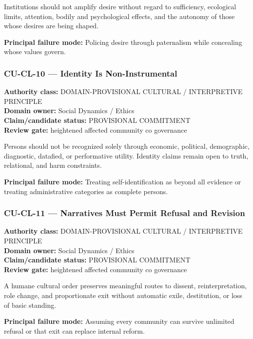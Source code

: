 \documentclass[
  11pt,
]{article}
\begin{document}
Institutions should not amplify desire without regard to sufficiency,
ecological limits, attention, bodily and psychological effects, and the
autonomy of those whose desires are being shaped.

\textbf{Principal failure mode:} Policing desire through paternalism
while concealing whose values govern.

\subsubsection{CU-CL-10 --- Identity Is
Non-Instrumental}\label{cu-cl-10-identity-is-non-instrumental}

\textbf{Authority class:} DOMAIN-PROVISIONAL CULTURAL / INTERPRETIVE
PRINCIPLE\\
\textbf{Domain owner:} Social Dynamics / Ethics\\
\textbf{Claim/candidate status:} PROVISIONAL COMMITMENT\\
\textbf{Review gate:} heightened affected community co governance

Persons should not be recognized solely through economic, political,
demographic, diagnostic, datafied, or performative utility. Identity
claims remain open to truth, relational, and harm constraints.

\textbf{Principal failure mode:} Treating self-identification as beyond
all evidence or treating administrative categories as complete persons.

\subsubsection{CU-CL-11 --- Narratives Must Permit Refusal and
Revision}\label{cu-cl-11-narratives-must-permit-refusal-and-revision}

\textbf{Authority class:} DOMAIN-PROVISIONAL CULTURAL / INTERPRETIVE
PRINCIPLE\\
\textbf{Domain owner:} Social Dynamics / Ethics\\
\textbf{Claim/candidate status:} PROVISIONAL COMMITMENT\\
\textbf{Review gate:} heightened affected community co governance

A humane cultural order preserves meaningful routes to dissent,
reinterpretation, role change, and proportionate exit without automatic
exile, destitution, or loss of basic standing.

\textbf{Principal failure mode:} Assuming every community can survive
unlimited refusal or that exit can replace internal reform.
\end{document}
